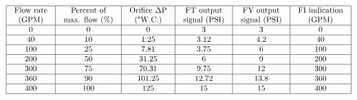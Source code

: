 






$$\vbox{\offinterlineskip
\halign{\strut
\vrule \quad\hfil # \ \hfil & 
\vrule \quad\hfil # \ \hfil & 
\vrule \quad\hfil # \ \hfil & 
\vrule \quad\hfil # \ \hfil & 
\vrule \quad\hfil # \ \hfil & 
\vrule \quad\hfil # \ \hfil \vrule \cr
\noalign{\hrule}
%
Flow rate & Percent of & Orifice $\Delta$P & FT output & FY output & FI indication \cr
%
(GPM) & max. flow (\%) & ("W.C.) & signal (PSI) & signal (PSI) & (GPM) \cr
%
\noalign{\hrule}
%
0 & 0 & 0 & 3 & 3 & 0 \cr
%
\noalign{\hrule}
%
40 & 10 & 1.25 & 3.12 & 4.2 & 40 \cr
%
\noalign{\hrule}
%
100 & 25 & 7.81 & 3.75 & 6 & 100 \cr
%
\noalign{\hrule}
%
200 & 50 & 31.25 & 6 & 9 & 200 \cr
%
\noalign{\hrule}
%
300 & 75 & 70.31 & 9.75 & 12 & 300 \cr
%
\noalign{\hrule}
%
360 & 90 & 101.25 & 12.72 & 13.8 & 360 \cr
%
\noalign{\hrule}
%
400 & 100 & 125 & 15 & 15 & 400 \cr
%
\noalign{\hrule}
} %
}$$ %











